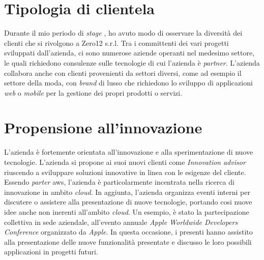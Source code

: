\section{Tipologia di clientela}
Durante il mio periodo di \textit{stage} , ho avuto modo di osservare la diversità dei clienti che si rivolgono a Zero12 s.r.l. Tra i committenti dei vari progetti sviluppati dall'azienda, ci sono numerose aziende operanti nel medesimo settore, le quali richiedono consulenze sulle tecnologie di cui l'azienda è \textit{partner}.
L'azienda collabora anche con clienti provenienti da settori diversi, come ad esempio il settore della moda, con \textit{brand} di lusso che richiedono lo sviluppo di applicazioni \textit{web} o \textit{mobile} per la gestione dei propri prodotti o servizi.

\section{Propensione all'innovazione}
L'azienda è fortemente orientata all'innovazione e alla sperimentazione di nuove tecnologie.
L'azienda si propone ai suoi nuovi clienti come \textit{Innovation advisor} riuscendo a sviluppare soluzioni innovative in linea con le esigenze del cliente. Essendo \textit{parter} \gls{aws}, l'azienda è particolarmente incentrata nella ricerca di innovazione in ambito \textit{cloud}.
In aggiunta, l'azienda organizza eventi interni per discutere o assistere alla presentazione di nuove tecnologie, portando cosi nuove idee anche non inerenti all'ambito \textit{cloud}. Un esempio, è stato la partecipazione collettiva in sede aziendale, all'evento annuale \textit{Apple Worldwide Developers Conference} organizzato da \textit{Apple}. In questa occasione, i presenti hanno assistito alla presentazione delle nuove funzionalità presentate e discusso le loro possibili applicazioni in progetti futuri.


    
    
